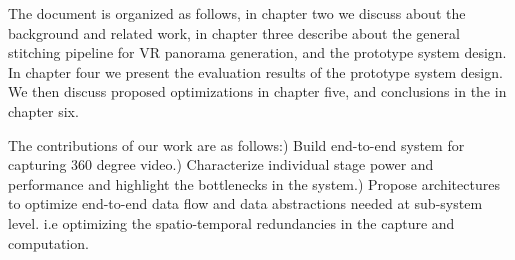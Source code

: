 

The document is organized as follows, in chapter two we discuss about the background and related work, in chapter three describe about the general stitching pipeline for VR panorama generation, and the prototype system design. In chapter four we present the evaluation results of the prototype system design. We then discuss proposed optimizations in chapter five, and conclusions in the  in chapter six.

The contributions of our work are as follows:) Build end-to-end system for capturing 360 degree video.) Characterize individual stage power and performance and highlight the bottlenecks in the system.) Propose architectures to optimize end-to-end data flow and data abstractions needed at sub-system level. i.e optimizing the spatio-temporal redundancies in the capture and computation.\newline



